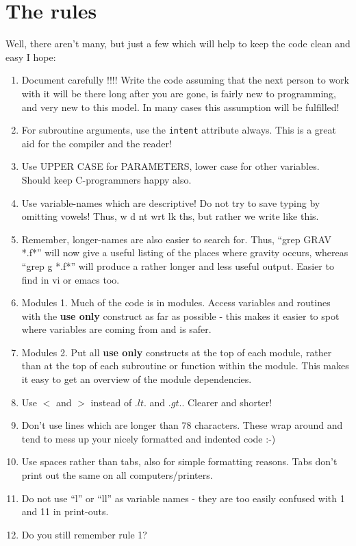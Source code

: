 \section{The rules}

Well, there aren't many, but just a few which will help to keep
the code clean and easy I hope:

\begin{enumerate}
\item
    Document carefully !!!!
    Write the code assuming that the next person to work with it will
    be there long after you are gone, is fairly new to programming,
    and very new to this model. In many cases this assumption will
    be fulfilled!
\item
    For subroutine arguments, use the {\tt intent} attribute always.
    This is a great aid for the compiler and the reader!
\item
    Use UPPER CASE for PARAMETERS, lower case for other variables.
    Should keep C-programmers happy also.
\item
    Use variable-names which are descriptive! Do not try to save
    typing by omitting vowels! Thus, w d nt wrt lk ths, but rather
    we write like this.
\item
    Remember, longer-names are also easier to search for. Thus,
    ``grep GRAV *.f*'' will now give a useful listing of the places where
    gravity occurs, whereas ``grep g *.f*'' will produce a rather longer 
    and less useful output. Easier to find in vi or emacs too.
\item Modules 1.
    Much of the code is in modules. Access variables and routines with
    the {\bf use only} construct as far as possible - this makes it
    easier to spot where variables are coming from and is safer.
\item Modules 2.
    Put all {\bf use only} constructs at the top of each module, rather than
    at the top of each subroutine or function within the module. This makes
    it easy to get an overview of the module dependencies.
\item
     Use $<$ and $>$ instead of $.lt.$ and $.gt.$. Clearer and shorter!
\item
    Don't use lines which are longer than 78 characters. These wrap
    around and tend to mess up your nicely formatted and indented code :-)
\item
    Use spaces rather than tabs, also for simple formatting reasons.
    Tabs don't print out the same on all computers/printers.
\item
    Do not use ``l'' or ``ll'' as variable names - they are too easily
    confused with 1 and 11 in print-outs. 
\item
    Do you still remember rule 1?
\end{enumerate}





